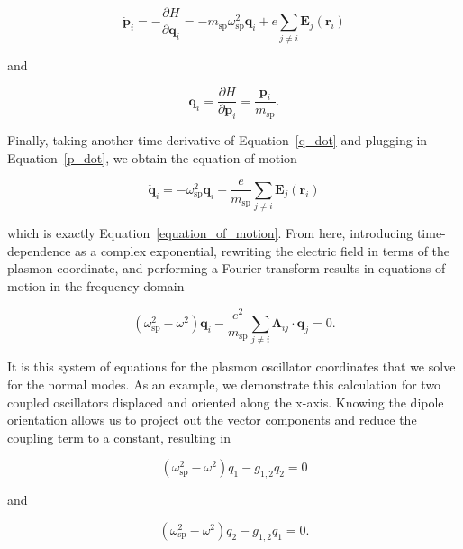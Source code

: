 \documentclass[journal=apchd5,manuscript=article]{achemso}
\begin{document}
\begin{equation}
\dot{\textbf{p}}_i = -\frac{\partial H}{\partial\textbf{q}_i} = -m_{\textrm{sp}}\omega_{\textrm{sp}}^2\textbf{q}_i + e\sum_{j\neq i}\textbf{E}_j(\textbf{r}_i)
\label{p_dot}
\end{equation}

\noindent and

\begin{equation}
\dot{\textbf{q}}_i = \frac{\partial H}{\partial\textbf{p}_i} = \frac{\textbf{p}_i}{m_{\textrm{sp}}}.
\label{q_dot}
\end{equation}

Finally, taking another time derivative of Equation~\ref{q_dot} and plugging in Equation~\ref{p_dot}, we obtain the equation of motion

\begin{equation}
\ddot{\textbf{q}}_i = -\omega_{\textrm{sp}}^2\textbf{q}_i + \frac{e}{m_{\textrm{sp}}}\sum_{j\neq i}\textbf{E}_j(\textbf{r}_i)
\label{equation_of_motion_again}
\end{equation}

\noindent which is exactly Equation~\ref{equation_of_motion}. From here, introducing time-dependence as a complex exponential, rewriting the electric field in terms of the plasmon coordinate, and performing a Fourier transform results in equations of motion in the frequency domain

\begin{equation}
(\omega_{\textrm{sp}}^2-\omega^2)\textbf{q}_i -\frac{e^2}{m_\textrm{sp}}\sum_{j\neq i}\boldsymbol{\Lambda}_{ij}\cdot\textbf{q}_j = 0.
\label{fourier_eom}
\end{equation}

It is this system of equations for the plasmon oscillator coordinates that we solve for the normal modes. As an example, we demonstrate this calculation for two coupled oscillators displaced and oriented along the x-axis. Knowing the dipole orientation allows us to project out the vector components and reduce the coupling term to a constant, resulting in

\begin{equation}
(\omega_{\textrm{sp}}^2-\omega^2)q_1 -g_{1,2}q_2 = 0
\label{fourier_eom_1}
\end{equation}

and

\begin{equation}
(\omega_{\textrm{sp}}^2-\omega^2)q_2 -g_{1,2}q_1 = 0.
\label{fourier_eom_2}
\end{equation}
\end{document}
